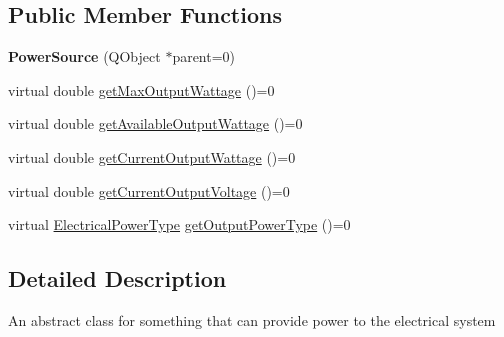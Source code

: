 \subsection*{Public Member Functions}
\begin{DoxyCompactItemize}
\item 
\hypertarget{class_challenger604_systems_1_1_power_source_a928bccc7b0f2533f4de701926747d910}{{\bfseries Power\-Source} (Q\-Object $\ast$parent=0)}\label{class_challenger604_systems_1_1_power_source_a928bccc7b0f2533f4de701926747d910}

\item 
virtual double \hyperlink{class_challenger604_systems_1_1_power_source_a7169f0c8fdce00d38a64b6b6bba04e18}{get\-Max\-Output\-Wattage} ()=0
\item 
virtual double \hyperlink{class_challenger604_systems_1_1_power_source_afbae38476468ff99c6f0da852133d732}{get\-Available\-Output\-Wattage} ()=0
\item 
virtual double \hyperlink{class_challenger604_systems_1_1_power_source_a941b5d3a7d51811809a22126f9b16f3d}{get\-Current\-Output\-Wattage} ()=0
\item 
virtual double \hyperlink{class_challenger604_systems_1_1_power_source_a4ad8976f2c13113c87180257df806317}{get\-Current\-Output\-Voltage} ()=0
\item 
virtual \hyperlink{namespace_challenger604_systems_a9ad1a793d94b97514092692cb7315afd}{Electrical\-Power\-Type} \hyperlink{class_challenger604_systems_1_1_power_source_a005b9cac72b89344aded232d87fde2f6}{get\-Output\-Power\-Type} ()=0
\end{DoxyCompactItemize}


\subsection{Detailed Description}
An abstract class for something that can provide power to the electrical system 

